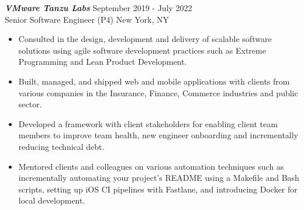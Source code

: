 {\sl \textbf{VMware Tanzu Labs}} \hfill September 2019 - July 2022 \\ Senior Software Engineer (P4) \hfill New York, NY
\begin{itemize}
    \item Consulted in the design, development and delivery of scalable software solutions using agile software development practices such as Extreme Programming and Lean Product Development.
    \item Built, managed, and shipped web and mobile applications with clients from various companies in the Insurance, Finance, Commerce industries and public sector.
    \item Developed a framework with client stakeholders for enabling client team members to improve team health, new engineer onboarding and incrementally reducing technical debt.
    \item Mentored clients and colleagues on various automation techniques such as incrementally automating your project's README using a Makefile and Bash scripts, setting up iOS CI pipelines with Fastlane, and introducing Docker for local development.
\end{itemize}
